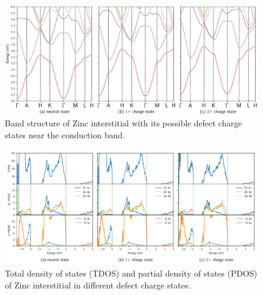 \begin{figure}[tbph!]
	\centering
	\includegraphics[width=1\textwidth]{"images/rnd/Zn_i-bandclose"}
	\caption[Band structure of Zinc interstitial with its possible defect charge states near the conduction band]{Band structure of Zinc interstitial with its possible defect charge states near the conduction band. }
	\label{fig:bandclose-Zn_i}
\end{figure}

\begin{figure}[t!]
	\centering
	\includegraphics[width=1\textwidth]{"images/rnd/Zn_i-dos"}
	\caption[Total density of states (TDOS) and partial density of states (PDOS) of Zinc interstitial in different  defect charge states]{Total density of states (TDOS) and partial density of states (PDOS) of Zinc interstitial in different  defect charge states.}
	\label{fig:dos-Zn_i}
\end{figure}

\clearpage

